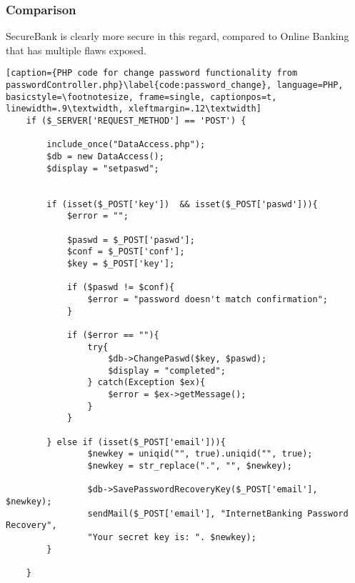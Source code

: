 \subsubsection{Comparison}
SecureBank is clearly more secure in this regard, compared to Online Banking that has multiple flaws exposed.

\begin{lstlisting}[caption={PHP code for change password functionality from passwordController.php}\label{code:password_change}, language=PHP, basicstyle=\footnotesize, frame=single, captionpos=t, linewidth=.9\textwidth, xleftmargin=.12\textwidth]
    if ($_SERVER['REQUEST_METHOD'] == 'POST') {

        include_once("DataAccess.php");
        $db = new DataAccess();
        $display = "setpaswd";


        if (isset($_POST['key'])  && isset($_POST['paswd'])){
            $error = "";

            $paswd = $_POST['paswd'];
            $conf = $_POST['conf'];
            $key = $_POST['key'];

            if ($paswd != $conf){
                $error = "password doesn't match confirmation";
            }

            if ($error == ""){
                try{
                    $db->ChangePaswd($key, $paswd);
                    $display = "completed";
                } catch(Exception $ex){
                    $error = $ex->getMessage();
                }
            }

        } else if (isset($_POST['email'])){
                $newkey = uniqid("", true).uniqid("", true);
                $newkey = str_replace(".", "", $newkey);

                $db->SavePasswordRecoveryKey($_POST['email'], $newkey);
                sendMail($_POST['email'], "InternetBanking Password Recovery",
                "Your secret key is: ". $newkey);
        }

    }
\end{lstlisting}

\clearpage
